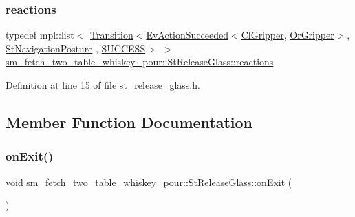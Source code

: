 \subsubsection{\texorpdfstring{reactions}{reactions}}
{\footnotesize\ttfamily typedef mpl\+::list$<$ \hyperlink{classsmacc_1_1Transition}{Transition}$<$\hyperlink{structsmacc_1_1default__events_1_1EvActionSucceeded}{Ev\+Action\+Succeeded}$<$\hyperlink{classsm__fetch__two__table__whiskey__pour_1_1cl__gripper_1_1ClGripper}{Cl\+Gripper}, \hyperlink{classsm__fetch__two__table__whiskey__pour_1_1OrGripper}{Or\+Gripper}$>$, \hyperlink{structsm__fetch__two__table__whiskey__pour_1_1StNavigationPosture}{St\+Navigation\+Posture} , \hyperlink{structsmacc_1_1default__transition__tags_1_1SUCCESS}{S\+U\+C\+C\+E\+SS}$>$ $>$ \hyperlink{structsm__fetch__two__table__whiskey__pour_1_1StReleaseGlass_ae475d9da3dcce67aa1951a1928ec91e6}{sm\+\_\+fetch\+\_\+two\+\_\+table\+\_\+whiskey\+\_\+pour\+::\+St\+Release\+Glass\+::reactions}}



Definition at line 15 of file st\+\_\+release\+\_\+glass.\+h.



\subsection{Member Function Documentation}
\mbox{\label{structsm__fetch__two__table__whiskey__pour_1_1StReleaseGlass_af682ad9a096cf3095ad3c167e5145b8a}} 
\subsubsection{\texorpdfstring{on\+Exit()}{onExit()}}
{\footnotesize\ttfamily void sm\+\_\+fetch\+\_\+two\+\_\+table\+\_\+whiskey\+\_\+pour\+::\+St\+Release\+Glass\+::on\+Exit (\begin{DoxyParamCaption}{ }\end{DoxyParamCaption})\hspace{0.3cm}{\ttfamily [inline]}}



